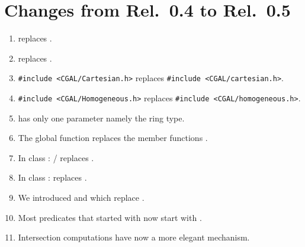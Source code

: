 
\cleardoublepage

\chapter{Changes from Rel.\ 0.4 to Rel.\ 0.5} \label{Changes}

\begin{enumerate}

\item {} replaces  .

\item {} replaces .

\item {\tt \#include <CGAL/Cartesian.h>}
      replaces {\tt \#include <CGAL/cartesian.h>}.

\item {\tt \#include <CGAL/Homogeneous.h>}
      replaces {\tt \#include <CGAL/homogeneous.h>}.

\item {} has only one parameter
      namely the ring type.

\item The global function 
      replaces the member functions 
      .

\item In class : /
      replaces .

\item In class : 
      replaces .

\item We introduced  and 
       which replace .

\item Most predicates that started with  now start
      with .

\item Intersection computations have now a more elegant mechanism.
\end{enumerate} 